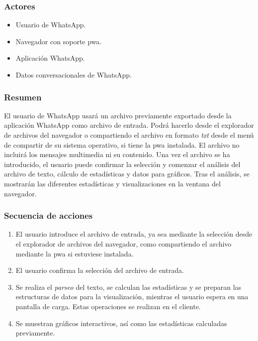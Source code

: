 \subsubsection{Actores}

\begin{itemize}
	\item Usuario de WhatsApp.
	\item Navegador con soporte \acrfull{pwa}.
	\item Aplicación WhatsApp.
	\item Datos conversacionales de WhatsApp.
\end{itemize}


\subsubsection{Resumen} El usuario de WhatsApp usará un archivo previamente exportado desde la aplicación WhatsApp como archivo de entrada. Podrá hacerlo desde el explorador de archivos del navegador o compartiendo el archivo en formato \textit{txt} desde el menú de compartir de su sistema operativo, si tiene la \acrfull{pwa} instalada. El archivo no incluirá los mensajes multimedia ni su contenido. Una vez el archivo se ha introducido, el usuario puede confirmar la selección y comenzar el análisis del archivo de texto, cálculo de estadísticas y datos para gráficos. Tras el análisis, se mostrarán las diferentes estadísticas y visualizaciones en la ventana del navegador.

\subsubsection{Secuencia de acciones}

\begin{enumerate}
	\item El usuario introduce el archivo de entrada, ya sea mediante la selección desde el explorador de archivos del navegador, como compartiendo el archivo mediante la \acrshort{pwa} si estuviese instalada.
	\item El usuario confirma la selección del archivo de entrada.
	\item Se realiza el \textit{parseo} del texto, se calculan las estadísticas y se preparan las estructuras de datos para la visualización, mientras el usuario espera en una pantalla de carga. Estas operaciones se realizan en el cliente.
	\item Se muestran gráficos interactivos, así como las estadísticas calculadas previamente.
\end{enumerate}

